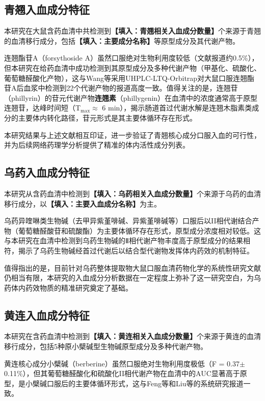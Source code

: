 \documentclass[12pt,a4paper,UTF8,openany]{ctexbook}
\newcommand{\compoundname}[1]{\textbf{#1}}
\begin{document}
\subsection{青翘入血成分特征}

本研究在大鼠含药血清中共检测到\textbf{【填入：青翘相关入血成分数量】}个来源于青翘的血清移行成分，包括\textbf{【填入：主要成分名称】}等原型成分及其代谢产物。

连翘酯苷A（forsythoside A）虽然口服绝对生物利用度较低（文献报道约0.5\%），但本研究在给药血清中成功检测到其原型成分及多种代谢产物（甲基化、硫酸化、葡萄糖醛酸化产物），这与Wang等\cite{WangF2018}采用UHPLC-LTQ-Orbitrap对大鼠口服连翘酯苷A后血浆中检测到22个代谢产物的报道高度一致。值得关注的是，连翘苷（phillyrin）的苷元代谢产物\compoundname{连翘素}（phillygenin）在血清中的浓度通常高于原型连翘苷，达峰时间短（T$_{\text{max}} \approx$ 6 min），揭示肠道首过代谢水解是连翘木脂素类成分的主要体内转化路径，苷元形式是其主要体循环存在形式\cite{Ye2013}。

本研究结果与上述文献相互印证，进一步验证了青翘核心成分口服入血的可行性，并为后续网络药理学分析提供了精准的体内活性成分列表。

\subsection{乌药入血成分特征}

本研究从含药血清中检测到\textbf{【填入：乌药相关入血成分数量】}个来源于乌药的血清移行成分，以\textbf{【填入：主要入血成分名称】}为主。

乌药异喹啉类生物碱（去甲异紫堇啡碱、异紫堇啡碱等）口服后以II相代谢结合产物（葡萄糖醛酸苷和硫酸酯）为主要体循环存在形式，原型成分浓度相对较低\cite{Li2015W,Chen2011W}。这与本研究在血清中检测到乌药生物碱的Ⅱ相代谢产物丰度高于原型成分的结果相符，揭示了乌药生物碱经首过代谢后以结合型代谢物发挥体内药效的机制特征。

值得指出的是，目前针对乌药整体提取物大鼠口服血清药物化学的系统性研究文献仍相当有限，本研究的入血成分分析数据在一定程度上弥补了这一研究空白，为乌药体内药效物质的精准研究奠定了基础。

\subsection{黄连入血成分特征}

本研究在含药血清中检测到\textbf{【填入：黄连相关入血成分数量】}个来源于黄连的血清移行成分，包括5种原小檗碱型生物碱原型成分及多种代谢产物。

黄连核心成分小檗碱（berberine）虽然口服绝对生物利用度极低（F = 0.37$\pm$0.11\%）\cite{FengX2021}，但其葡萄糖醛酸化和硫酸化II相代谢产物在血清中的AUC显著高于原型，是小檗碱口服后的主要体循环形式，这与Feng等\cite{FengX2021}和Liu等\cite{LiuYi2020}的系统研究报道一致。
\end{document}

